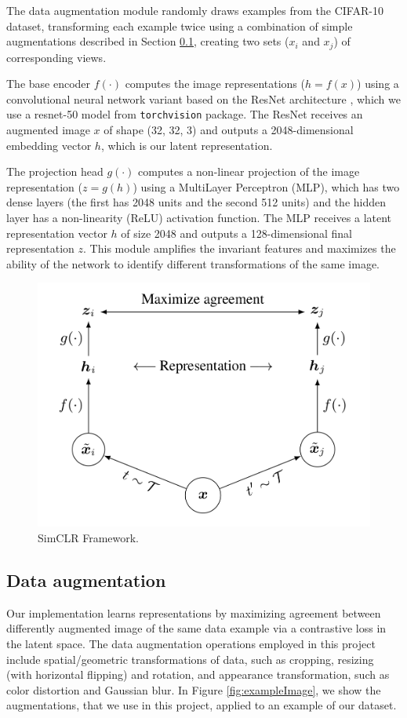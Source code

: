 \documentclass{article}
\begin{document}
The data augmentation module randomly draws examples from the CIFAR-10 dataset, transforming each example twice using a combination of simple augmentations described in Section \ref{section:dataaug}, creating two sets ($x_i$ and $x_j$) of corresponding views. 

The base encoder $f(\cdot)$ computes the image representations ($h = f(x)$) using a convolutional neural network variant based on the ResNet architecture \cite{resnet}, which we use a resnet-50 model from \texttt{torchvision} package. The ResNet receives an augmented image $x$ of shape (32, 32, 3) and outputs a 2048-dimensional embedding vector $h$, which is our latent representation.

The projection head $g(\cdot)$ computes a non-linear projection of the image representation ($z = g(h)$) using a MultiLayer Perceptron (MLP), which has two dense layers (the first has 2048 units and the second 512 units) and the hidden layer has a non-linearity (ReLU) activation function. The MLP receives a latent representation vector $h$ of size 2048 and outputs a 128-dimensional final representation $z$. This module amplifies the invariant features and maximizes the ability of the network to identify different transformations of the same image.

\begin{figure}
  \centering
  \includegraphics[width=0.7\linewidth]{framework.png}
  \caption{SimCLR Framework.}
  \label{fig:framework}
\end{figure}

\subsection{Data augmentation}
\label{section:dataaug}

Our implementation learns representations by maximizing agreement between differently augmented image of the same data example via a contrastive loss in the latent space. The data augmentation operations employed in this project include spatial/geometric transformations of data, such as cropping, resizing (with horizontal flipping) and rotation, and appearance transformation, such as color distortion and Gaussian blur. In Figure \ref{fig:exampleImage}, we show the augmentations, that we use in this project, applied to an example of our dataset.
\end{document}
